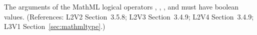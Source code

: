 The arguments of the MathML logical operators ,
, , and  must have boolean values.
(References: L2V2 Section~3.5.8; L2V3 Section~3.4.9; L2V4 Section~3.4.9;
L3V1 Section~\ref{sec:mathmltype}.)
